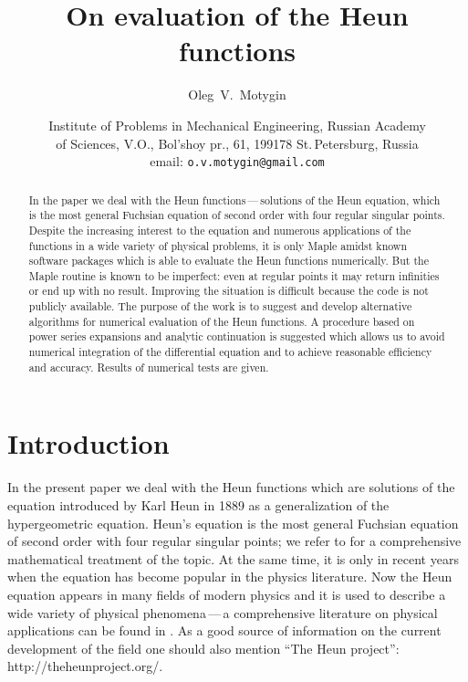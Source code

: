 \documentclass[11pt]{article}
\begin{document}
\title{On evaluation of the Heun functions}

\author{Oleg\ V.\ Motygin}
 
\date{Institute of Problems in Mechanical Engineering, Russian Academy\\ of
Sciences,
 V.O., Bol'shoy pr., 61, 199178 St.\,Petersburg, Russia\\ 
email: \texttt{o.v.motygin@gmail.com}}

\maketitle

\begin{abstract}
In the paper we deal with the Heun functions\,---\,solutions of the Heun
equation, which is the most general Fuchsian equation of second order with four
regular singular points. Despite the increasing interest to the equation and
numerous applications of the functions in a wide variety of physical problems,
it is only Maple amidst known software packages which is able to evaluate the
Heun functions numerically. But the Maple routine is known to be imperfect: even
at regular points it may return infinities or end up with no result. Improving
the situation is difficult because the code is not publicly available. The
purpose of the work is to suggest and develop alternative algorithms for
numerical evaluation of the Heun functions. A procedure based on power series
expansions and analytic continuation is suggested  which allows us to avoid
numerical integration of the differential equation and to achieve reasonable
efficiency and accuracy. Results of numerical tests are given.
\end{abstract}

\section{Introduction}
\label{intro0}

In the present paper we deal with the Heun functions which are solutions of the
equation introduced by Karl Heun in 1889 \cite{Heun} as a generalization of the
hypergeometric equation. Heun's equation is the most general Fuchsian equation
of second order with four regular singular points; we refer to
\cite{Ronveaux1995,SlavyanovLay2000,192-Maier2007,SleemanKuznetzov2010} for a
comprehensive mathematical treatment of the topic. At the same time, it is only
in recent years when the equation has become popular in the physics literature.
Now the Heun equation appears in many fields of modern physics and it is used to
describe a wide variety of physical phenomena\,---\,a comprehensive literature
on physical applications can be found in \cite{Hortacsu2011}. As a good source
of information on the current development of the field one should also mention
``The Heun project'': http://theheunproject.org/.
\end{document}
